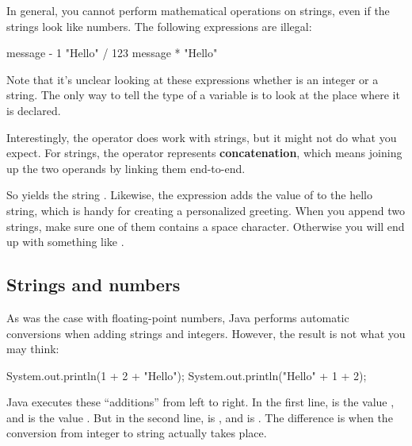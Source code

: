 
In general, you cannot perform mathematical operations on strings, even if the strings look like numbers.
The following expressions are illegal:

\begin{code}
    message - 1     "Hello" / 123     message * "Hello"
\end{code}

Note that it's unclear looking at these expressions whether  is an integer or a string.
The only way to tell the type of a variable is to look at the place where it is declared.


Interestingly, the \java{+} operator does work with strings, but it might not do what you expect.
For strings, the \java{+} operator represents {\bf concatenation}, which means joining up the two operands by linking them end-to-end.

So  yields the string .
Likewise, the expression  adds the value of  to the hello string, which is handy for creating a personalized greeting.
When you append two strings, make sure one of them contains a space character.
Otherwise you will end up with something like .

\subsection{Strings and numbers}

As was the case with floating-point numbers, Java performs automatic conversions when adding strings and integers.
However, the result is not what you may think:

\begin{code}
    System.out.println(1 + 2 + "Hello");
    System.out.println("Hello" + 1 + 2);
\end{code}

Java executes these ``additions'' from left to right.
In the first line,  is the value , and  is the value .
But in the second line,  is , and  is .
The difference is when the conversion from integer to string actually takes place.

%


